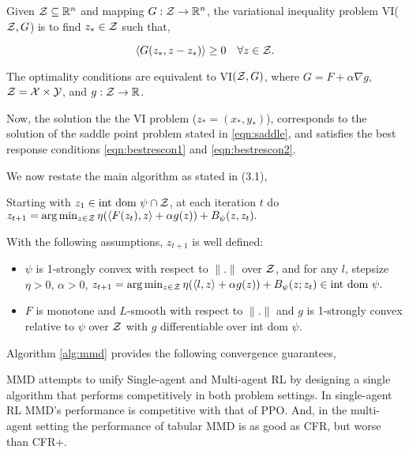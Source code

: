 \begin{definition}
    Given $\mathcal{Z} \subseteq \mathbb{R}^n$ and mapping $G: \mathcal{Z} \rightarrow \mathbb{R}^n$, the variational inequality problem
    VI($\mathcal{Z}, G$) is to find $z_{\ast} \in \mathcal{Z}$ such that,

    $$\langle G(z_{\ast}, z - z_{\ast}) \rangle \geq 0 \quad \forall z \in \mathcal{Z}. $$
\end{definition}


The optimality conditions are equivalent to VI$(\mathcal{Z}, G)$, where $G = F + \alpha \nabla g$,  $\mathcal{Z} = \mathcal{X} \times \mathcal{Y}$, and
$g: \mathcal{Z} \rightarrow \mathbb{R}$.

Now, the solution the the VI problem ($z_{\ast}= (x_{\ast}, y_{\ast})$), corresponds to the
solution of the saddle point problem stated in \ref{eqn:saddle}, and satisfies the best response conditions
\ref{eqn:bestrescon1} and \ref{eqn:bestrescon2}.

We now restate the main algorithm as stated in \cite{sokotaUnified2023}(3.1),

\begin{alprocedure}
    \label{alg:mmd}
    Starting with $z_1  \in \text{int dom } \psi \cap \mathcal{Z}$, at each iteration $t$ do
    $z_{t+1} = \arg \min_{z \in \mathcal{Z}} \eta (\langle F(z_t), z\rangle + \alpha g(z)) + B_{\psi} (z, z_t).$
\end{alprocedure}

With the following assumptions, $z_{t+1}$ is well defined:

\begin{itemize}
    \item $\psi$ is 1-strongly convex with respect to $\|.\|$ over $\mathcal{Z}$, and for
          any $l$, stepsize $\eta > 0$, $\alpha > 0$,
          $z_{t+1} = \arg \min_{z \in \mathcal{Z}} \eta (\langle l, z \rangle + \alpha g(z)) + B_{\psi}(z;z_t) \in \text{int dom } \psi.$

    \item $F$ is monotone and $L$-smooth with respect to $\|.\|$ and $g$ is 1-strongly convex
          relative to $\psi$ over $\mathcal{Z}$ with $g$ differentiable over int dom $\psi$.
\end{itemize}

Algorithm \ref{alg:mmd} provides the following convergence guarantees,





MMD attempts to unify Single-agent and Multi-agent RL by designing a single
algorithm that performs competitively in both problem settings. In single-agent RL
MMD's performance is competitive with that of PPO. And, in the multi-agent setting
the performance of tabular MMD is as good as CFR, but worse than CFR+.